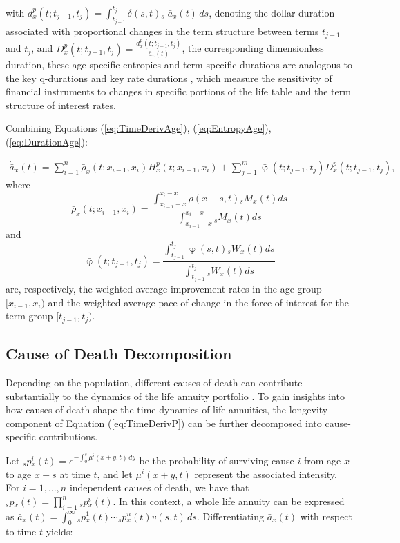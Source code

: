 \documentclass[12pt]{article}
\begin{document}
with ${d}^{p}_{x}(t;t_{j-1},t_{j}) = \int_{t_{j-1}}^{t_j} \delta(s,t) {}_s|\bar{a}_x(t) \, ds$, denoting the dollar duration associated with proportional changes in the term structure between terms $t_{j-1}$ and $t_{j}$, and ${D}^{p}_{x}(t;t_{j-1},t_{j}) = \frac{{d}^{p}_{x}(t;t_{j-1},t_{j})}{\bar{a}_x(t)}$, the corresponding dimensionless duration, these age-specific entropies and term-specific durations are analogous to the key q-durations \citep{li2012key} and key rate durations \citep{Ho1992}, which measure the sensitivity of financial instruments to changes in specific portions of the life table and the term structure of interest rates.



Combining Equations (\ref{eq:TimeDerivAge}), (\ref{eq:EntropyAge}), (\ref{eq:DurationAge}):  

\begin{equation}\label{eq:TimeDerivAge2}
\begin{split}
 \acute{\bar{a}}_x(t) = \sum_{i=1}^n\bar{\rho}_x(t;x_{i-1}, x_i){H}^{p}_x(t;x_{i-1}, x_i) +\sum_{j=1}^m\bar{\upvarphi}(t;t_{j-1},t_{j}){D}^{p}_x(t;t_{j-1},t_{j}),  
\end{split}
\end{equation}
where $$\bar{\rho}_x(t;x_{i-1}, x_i)= \frac{\int_{x_{i-1}-x}^{x_i-x} \rho(x+s,t) {}_sM_x(t)  ds}{\int_{x_{i-1}-x}^{x_i-x}  {}_sM_x(t)ds}$$ and 
$$\bar{\upvarphi}(t;t_{j-1},t_{j})= \frac{\int_{t_{j-1}}^{t_{j}} \upvarphi(s,t) {}_sW_x(t)  ds}{\int_{t_{j-1}}^{t_{j}} {}_sW_x(t) ds}$$ are, respectively, the weighted average improvement rates in the age group $[x_{i-1},x_{i})$ and the weighted average pace of change in the force of interest for the term group $[t_{j-1},t_{j})$. 





\subsection{Cause of Death Decomposition}


Depending on the population, different causes of death can contribute substantially to the dynamics of the life annuity portfolio \citep{lin2005securitization,kallestrup2020insight}. To gain insights into how causes of death shape the time dynamics of life annuities, the longevity component of Equation (\ref{eq:TimeDerivP}) can be further decomposed into cause-specific contributions.

Let ${_s}p{^i_x}(t) = e^{-\int_{0}^{s} \mu{^i}(x+y,t) \, dy}$ be the probability of surviving cause $i$ from age \(x\) to age \(x+s\) at time $t$, and let $\mu{^i}(x+y,t)$ represent the associated intensity. For $i = 1, \dots, n$ independent causes of death, we have that ${_s}p{_x}(t) = \prod_{i=1}^{n} {_s}p{^i_x}(t)$. In this context, a whole life annuity can be expressed as $\bar{a}_x(t) = \int_0^\infty {_s}p{^1_x}(t) \cdots {_s}p{^n_x}(t) {v}(s,t)\, ds.$ Differentiating $\bar{a}_x(t)$ with respect to time $t$ yields:
\end{document}
